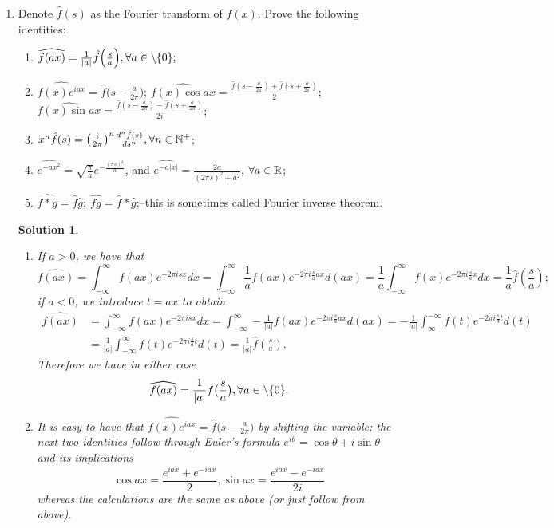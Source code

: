 \documentclass[6pt]{article}
\newtheorem{solution}{Solution}
\numberwithin{equation}{section}
\def\mathbb{\Bbb}
\begin{document}
\begin{enumerate}
\item Denote $\hat f(s)$ as the Fourier transform of $f(x)$.  Prove the following identities:
\begin{enumerate}
  \item $\widehat{f(ax)}=\frac{1}{\vert a\vert}\hat f\Big(\frac{s}{a}\Big), \forall a\in\mathbb\backslash \{0\};$
  \item $\widehat{f(x)e^{iax}}=\widehat{f}\Big(s-\frac{a}{2\pi}\Big)$; $\widehat{f(x)\cos ax}=\frac{\widehat{f}(s-\frac{a}{2\pi})+\widehat{f}(s+\frac{a}{2\pi})}{2}$; $\widehat{f(x)\sin ax}=\frac{\widehat{f}(s-\frac{a}{2\pi})-\widehat{f}(s+\frac{a}{2\pi})}{2i}$;
  \item $x^n\hat f(s)=\big(\frac{i}{2\pi}\big)^n\frac{d^n \hat f(s)}{ds^n}, \forall n\in\mathbb N^+$;
  \item $\widehat{e^{-ax^2}}=\sqrt{\frac{\pi}{a}}e^{-\frac{(\pi s)^2}{a}}$, and $\widehat{e^{-a|x|}}=\frac{2a}{(2\pi s)^2+a^2}$, $\forall a\in\mathbb R$;
  \item $\widehat{f\ast g}=\hat f \hat g;~  \widehat{fg}=\hat f\ast \hat g$;--this is sometimes called Fourier inverse theorem.
\end{enumerate}

\begin{solution}
\begin{enumerate}
  \item If $a>0$, we have that
\[\widehat{f(ax)}=\int^{\infty}_{-\infty}f(ax)e^{-2\pi isx}dx=\int^{\infty}_{-\infty}\frac{1}{a} f(ax)e^{-2\pi i\frac{s}{a} ax}d(ax)=\frac{1}{a}\int^{\infty}_{-\infty}f(x)e^{-2\pi i\frac{s}{a}x}dx=\frac{1}{a}\hat{f}(\frac{s}{a});\]
if $a<0$, we introduce $t=ax$ to obtain
\begin{align*}
\widehat{f(ax)}&=\int^{\infty}_{-\infty}f(ax)e^{-2\pi isx}dx=\int^{\infty}_{-\infty}-\frac{1}{\vert a\vert} f(ax)e^{-2\pi i\frac{s}{a} ax}d(ax)=-\frac{1}{\vert a\vert}\int^{-\infty}_{\infty} f(t)e^{-2\pi i\frac{s}{a} t}d(t) \\
&=\frac{1}{\vert a\vert}\int^{\infty}_{-\infty} f(t)e^{-2\pi i\frac{s}{a} t}d(t)=\frac{1}{\vert a\vert}\hat{f}(\frac{s}{a}).
\end{align*}
Therefore we have in either case
\[\widehat{f(ax)}=\frac{1}{\vert a\vert}\hat f\big(\frac{s}{a}\big), \forall a\in\mathbb\backslash \{0\}. \]

\item It is easy to have that $\widehat{f(x)e^{iax}}=\widehat{f}\Big(s-\frac{a}{2\pi}\Big)$ by shifting the variable; the next two identities follow through Euler's formula $e^{i\theta}=\cos \theta +i\sin \theta$ and its implications
\[\cos ax=\frac{e^{iax}+e^{-iax}}{2}, \sin ax=\frac{e^{iax}-e^{-iax}}{2i}\]
whereas the calculations are the same as above (or just follow from above).


\end{enumerate}
\end{solution}
\end{enumerate}
\end{document}
